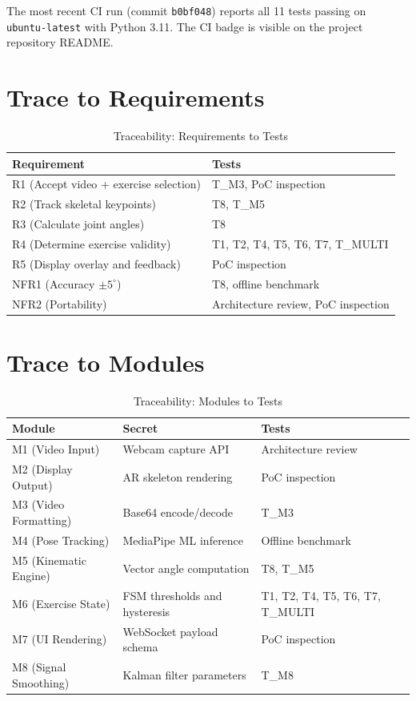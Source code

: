 \documentclass[12pt, titlepage]{article}
\begin{document}
The most recent CI run (commit \texttt{b0bf048}) reports all 11 tests passing
on \texttt{ubuntu-latest} with Python 3.11. The CI badge is visible on the
project repository README.

\section{Trace to Requirements}
\label{sec:trace_req}

\begin{table}[H]
\centering
\begin{tabular}{l l}
\toprule
\textbf{Requirement} & \textbf{Tests}\\
\midrule
R1 (Accept video + exercise selection) & T\_M3, PoC inspection\\
R2 (Track skeletal keypoints)          & T8, T\_M5\\
R3 (Calculate joint angles)            & T8\\
R4 (Determine exercise validity)       & T1, T2, T4, T5, T6, T7, T\_MULTI\\
R5 (Display overlay and feedback)      & PoC inspection\\
NFR1 (Accuracy $\pm 5^\circ$)          & T8, offline benchmark\\
NFR2 (Portability)                     & Architecture review, PoC inspection\\
\bottomrule
\end{tabular}
\caption{Traceability: Requirements to Tests}
\label{tab:req_trace}
\end{table}

\section{Trace to Modules}
\label{sec:trace_mod}

\begin{table}[H]
\centering
\begin{tabular}{l l l}
\toprule
\textbf{Module} & \textbf{Secret} & \textbf{Tests}\\
\midrule
M1 (Video Input)      & Webcam capture API              & Architecture review\\
M2 (Display Output)   & AR skeleton rendering           & PoC inspection\\
M3 (Video Formatting) & Base64 encode/decode            & T\_M3\\
M4 (Pose Tracking)    & MediaPipe ML inference          & Offline benchmark\\
M5 (Kinematic Engine) & Vector angle computation        & T8, T\_M5\\
M6 (Exercise State)   & FSM thresholds and hysteresis   & T1, T2, T4, T5, T6, T7, T\_MULTI\\
M7 (UI Rendering)     & WebSocket payload schema        & PoC inspection\\
M8 (Signal Smoothing) & Kalman filter parameters        & T\_M8\\
\bottomrule
\end{tabular}
\caption{Traceability: Modules to Tests}
\label{tab:mod_trace}
\end{table}
\end{document}
